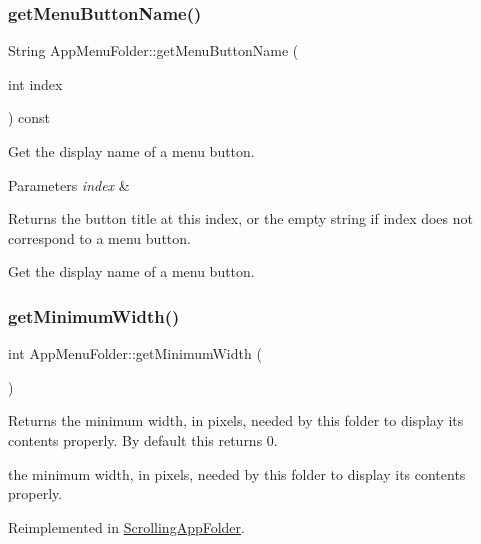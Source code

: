 \subsubsection{\texorpdfstring{get\+Menu\+Button\+Name()}{getMenuButtonName()}}
{\footnotesize\ttfamily String App\+Menu\+Folder\+::get\+Menu\+Button\+Name (\begin{DoxyParamCaption}\item[{int}]{index }\end{DoxyParamCaption}) const}

Get the display name of a menu button.


\begin{DoxyParams}{Parameters}
{\em index} & ~\newline
 \\
\hline
\end{DoxyParams}
\begin{DoxyReturn}{Returns}
the button title at this index, or the empty string if index does not correspond to a menu button.
\end{DoxyReturn}
Get the display name of a menu button. \mbox{\label{classAppMenuFolder_a0c46e9cfa9d2c3d5db1b0e8fe5d00fb9}} 
\subsubsection{\texorpdfstring{get\+Minimum\+Width()}{getMinimumWidth()}}
{\footnotesize\ttfamily int App\+Menu\+Folder\+::get\+Minimum\+Width (\begin{DoxyParamCaption}{ }\end{DoxyParamCaption})\hspace{0.3cm}{\ttfamily [virtual]}}

\begin{DoxyReturn}{Returns}
the minimum width, in pixels, needed by this folder to display its contents properly. By default this returns 0.

the minimum width, in pixels, needed by this folder to display its contents properly. 
\end{DoxyReturn}


Reimplemented in \mbox{\hyperlink{classScrollingAppFolder_aa70592d62c840b03bb1ad3602a34ef96}{Scrolling\+App\+Folder}}.

\mbox{\label{classAppMenuFolder_a5b3a153cc2634a5804b2cd9b33f25105}} 
